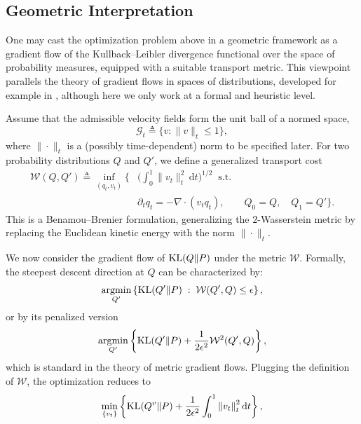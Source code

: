 \documentclass[12pt,paper=letter]{scrreprt}
\def\defeq{\triangleq} %
\def\norm#1{\left\|{#1}\right\|} %
\def\KL#1#2{\textnormal{KL}({#1}\Vert{#2})}
\providecommand{\argmin}{\mathop\mathrm{arg min}}
\newcommand{\dd}{\mathrm{d}}
\newcommand{\df}{\mathrm{d}}
\begin{document}
\subsection*{Geometric Interpretation}



One may cast the optimization problem above in a geometric framework as a gradient flow of the Kullback--Leibler divergence functional over the space of probability measures, equipped with a suitable transport metric.
This viewpoint parallels the theory of gradient flows in spaces of distributions, developed for example in \citet{ambrosio2005gradient}, although here we only work at a formal and heuristic level.

Assume that the admissible velocity fields form the unit ball of a normed space,
\[
\mathcal{G}_t \defeq \{ v : \|v\|_t \le 1 \},
\]
where $\|\cdot\|_t$ is a (possibly time-dependent) norm to be specified later.
For two probability distributions $Q$ and $Q'$, we define a generalized transport cost
\begin{align}
\mathcal{W}(Q,Q')
\defeq \inf_{(q_t,v_t)}
\Bigg\{
& \Big( \int_0^1 \|v_t\|_t^2 \, \dd t \Big)^{1/2}
\;\; \text{s.t.} \label{eq: curly W} \\
& \partial_t q_t = - \nabla \cdot (v_t q_t), \qquad
Q_0 = Q, \quad Q_1 = Q'
\Bigg\}. \nonumber
\end{align}
This is a Benamou--Brenier formulation, generalizing the $2$-Wasserstein metric by replacing the Euclidean kinetic energy with the norm $\|\cdot\|_t$.

We now consider the gradient flow of $\KL{Q}{P}$ under the metric $\mathcal{W}$.
Formally, the steepest descent direction at $Q$ can be characterized by: %
\begin{equation}
\argmin_{Q'}
\left\{
\KL{Q'}{P}
\;:\;
\mathcal{W}(Q',Q) \le \epsilon
\right\},
\label{eq: proximal_KL}
\end{equation}
or by its penalized version
\[
\argmin_{Q'}
\left\{
\KL{Q'}{P} + \frac{1}{2\epsilon^2} \mathcal{W}^2(Q',Q)
\right\},
\]
which is standard in the theory of metric gradient flows.
Plugging the definition of $\mathcal W$, the optimization reduces to 
\[
\min_{\{v_t\}}
\left\{
\KL{Q^{v}}{P} + \frac{1}{2\epsilon^2} \int_0^1 \norm{v_t}_t^2 \df t 
\right\},
\]
\end{document}
